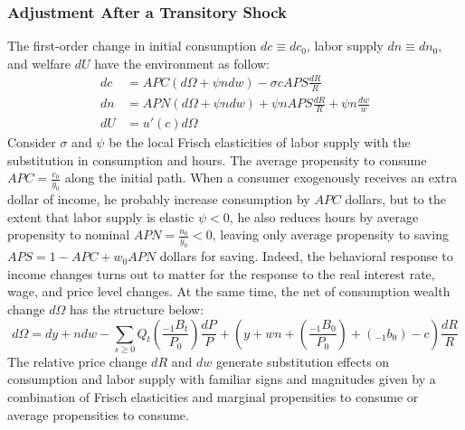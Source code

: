 \documentclass[11pt,letterpaper]{article}
\begin{document}
{\subsubsection{Adjustment After a Transitory Shock}
The first-order change in initial consumption $dc \equiv dc_{0}$, labor supply $dn \equiv dn_{0}$, and welfare $dU$ have the environment as follow:
\begin{align}
	\label{e3} dc &= APC(d\Omega + \psi ndw) - \sigma c APS \frac{dR}{R} \\ 
	\label{e4} dn &= APN(d\Omega + \psi ndw) + \psi n APS \frac{dR}{R} + \psi n \frac{dw}{w} \\ 
	\label{e5} dU &= u' (c) d \Omega 
\end{align}
Consider $\sigma$ and $\psi$ be the local Frisch elasticities of labor supply with the substitution in consumption and hours. The average propensity to consume $APC =\frac{ c_{0}}{ y_{0}}$ along the initial path. When a consumer exogenously receives an extra dollar of income, he probably increase consumption by $APC$ dollars, but to the extent that labor supply is elastic $\psi <0$, he also reduces hours by average propensity to nominal $APN = \frac{n_{0}}{y_{0}} <0$, leaving only average propensity to saving $APS = 1 - 
APC + w_{0}APN$ dollars for saving. Indeed, the behavioral response to income changes turns out to matter for the response to the real interest rate, wage, and price level changes. At the same time, the net of consumption wealth change $d\Omega$ has the structure below: 
\begin{equation}\label{e6}
	d\Omega = dy +ndw - \sum_{s \geqslant 0}Q_{t}\left(\frac{_{-1}B_{t}}{P_{0}}\right) \frac{dP}{P} + \left(y + wn + \left(\frac{_{-1}B_{0}}{P_{0}}\right) + (_{-1}b_{0}) - c\right) \frac{dR}{R}
\end{equation}
The relative price change $dR$ and $dw$ generate substitution effects on consumption and labor supply with familiar signs and magnitudes given by a combination of Frisch elasticities and marginal propensities to consume or average propensities to consume. 
}
\end{document}
